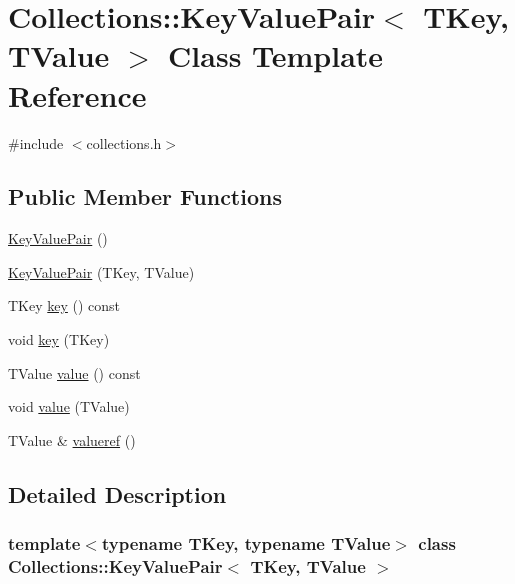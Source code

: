 \hypertarget{class_collections_1_1_key_value_pair}{}\section{Collections\+:\+:Key\+Value\+Pair$<$ T\+Key, T\+Value $>$ Class Template Reference}
\label{class_collections_1_1_key_value_pair}


{\ttfamily \#include $<$collections.\+h$>$}

\subsection*{Public Member Functions}
\begin{DoxyCompactItemize}
\item 
\hyperlink{class_collections_1_1_key_value_pair_aa64a4c74132079a13bdc1469e43eb75a}{Key\+Value\+Pair} ()
\item 
\hyperlink{class_collections_1_1_key_value_pair_a89b31d39dbe604c5ccf72989406925d3}{Key\+Value\+Pair} (T\+Key, T\+Value)
\item 
T\+Key \hyperlink{class_collections_1_1_key_value_pair_a677589bdfb5b66154ff76beac4289958}{key} () const
\item 
void \hyperlink{class_collections_1_1_key_value_pair_aa0c15557fd02131df792d633b3e094c9}{key} (T\+Key)
\item 
T\+Value \hyperlink{class_collections_1_1_key_value_pair_a7ffc604a86ce512c419a212d6e92ccb0}{value} () const
\item 
void \hyperlink{class_collections_1_1_key_value_pair_a7e18d15bccbb04704445daf632cda15d}{value} (T\+Value)
\item 
T\+Value \& \hyperlink{class_collections_1_1_key_value_pair_a233be67709beba1bd5a4d00c249345d5}{valueref} ()
\end{DoxyCompactItemize}


\subsection{Detailed Description}
\subsubsection*{template$<$typename T\+Key, typename T\+Value$>$\newline
class Collections\+::\+Key\+Value\+Pair$<$ T\+Key, T\+Value $>$}

